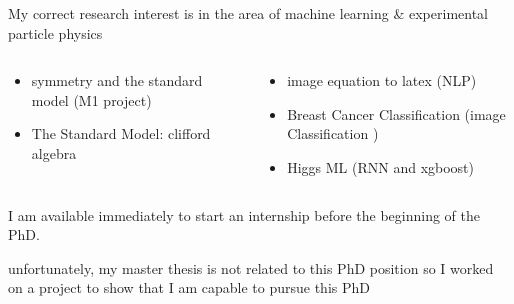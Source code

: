 \documentclass[11pt,aspectratio=169]{beamer}
\begin{document}
\begin{frame}{\underline{\secname}}

	My correct research interest is in the area of machine learning \& experimental particle physics

	
		\begin{columns}
		\begin{column}{0.5\linewidth}
	
	\begin{itemize} 			  \setlength\itemsep{0em}

		\item symmetry and the standard model (M1 project)
		\item The Standard Model: clifford algebra
		
		
	\end{itemize}	

			\end{column}
		
		\begin{column}{0.5\linewidth}
		
	\begin{itemize}			  \setlength\itemsep{0em}

		\item image equation to latex (NLP)
		\item Breast Cancer Classification (image Classification )
		\item Higgs ML (RNN and xgboost)

	\end{itemize}
			\end{column}
	\end{columns}
	
\vspace{20pt}
	I am available immediately to start an internship before the beginning of the PhD.

	\vspace{20pt}

unfortunately, my master thesis is not related to this PhD position so I worked on a project to show that I am capable to pursue this PhD 





	
\end{frame}
\end{document}
